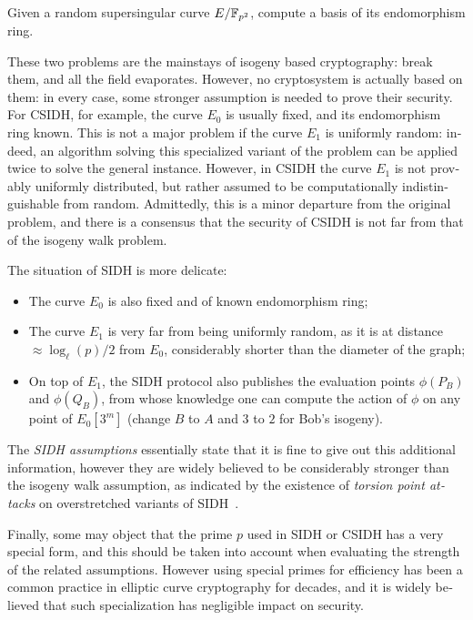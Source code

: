 \begin{otherlanguage}{english}
\begin{definition}
  Given a random supersingular curve $E/\mathbb{F}_{p^2}$, compute a basis of
  its endomorphism ring.
\end{definition}

These two problems are the mainstays of isogeny based cryptography:
break them, and all the field evaporates. However, no cryptosystem is
actually based on them: in every case, some stronger assumption is
needed to prove their security. For CSIDH, for example, the curve
$E_0$ is usually fixed, and its endomorphism ring known. This is not a
major problem if the curve $E_1$ is uniformly random: indeed, an
algorithm solving this specialized variant of the problem can be
applied twice to solve the general instance. However, in CSIDH the
curve $E_1$ is not provably uniformly distributed, but rather assumed
to be computationally indistinguishable from random. Admittedly, this
is a minor departure from the original problem, and there is a
consensus that the security of CSIDH is not far from that of the
isogeny walk problem.

The situation of SIDH is more delicate:
\begin{itemize}
\item The curve $E_0$ is also fixed and of known endomorphism ring;
\item The curve $E_1$ is very far from being uniformly random, as it
  is at distance $\approx\log_\ell(p)/2$ from $E_0$, considerably
  shorter than the diameter of the graph;
\item On top of $E_1$, the SIDH protocol also publishes the evaluation
  points $\phi(P_B)$ and $\phi(Q_B)$, from whose knowledge one can
  compute the action of $\phi$ on any point of $E_0[3^m]$ (change $B$
  to $A$ and $3$ to $2$ for Bob's isogeny).
\end{itemize}

The \emph{SIDH assumptions} essentially state that it is fine to give
out this additional information, however they are widely believed to
be considerably stronger than the isogeny walk assumption, as
indicated by the existence of \emph{torsion point attacks} on
overstretched variants of SIDH~\cite{AC:Petit17,EPRINT:KMPPS20}.

Finally, some may object that the prime $p$ used in SIDH or CSIDH has
a very special form, and this should be taken into account when
evaluating the strength of the related assumptions. However using
special primes for efficiency has been a common practice in elliptic
curve cryptography for decades, and it is widely believed that such
specialization has negligible impact on security.


\end{otherlanguage}
